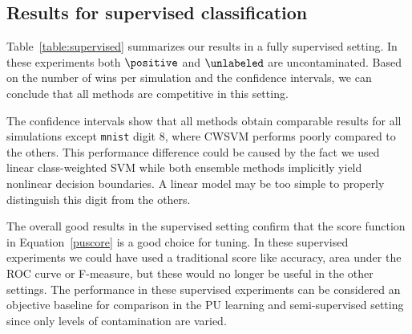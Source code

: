 \subsection{Results for supervised classification}
Table~\ref{table:supervised} summarizes our results in a fully supervised setting. In these experiments both $\positive$ and $\unlabeled$ are uncontaminated. Based on the number of wins per simulation and the confidence intervals, we can conclude that all methods are competitive in this setting. 

The confidence intervals show that all methods obtain comparable results for all simulations except \texttt{mnist} digit $8$, where CWSVM performs poorly compared to the others. This performance difference could be caused by the fact we used linear class-weighted SVM while both ensemble methods implicitly yield nonlinear decision boundaries. A linear model may be too simple to properly distinguish this digit from the others.

The overall good results in the supervised setting confirm that the score function in Equation~\eqref{puscore} is a good choice for tuning. In these supervised experiments we could have used a traditional score like accuracy, area under the ROC curve or F-measure, but these would no longer be useful in the other settings. The performance in these supervised experiments can be considered an objective baseline for comparison in the PU learning and semi-supervised setting since only levels of contamination are varied.

